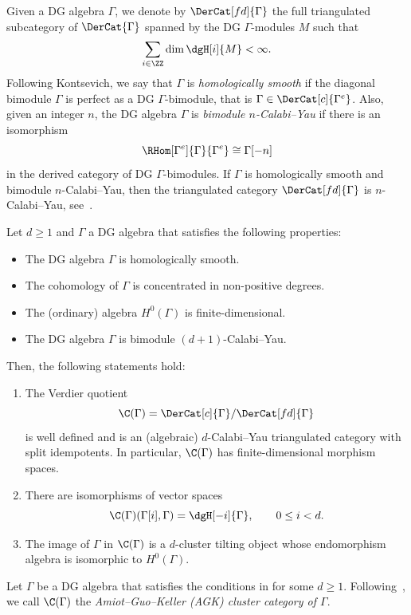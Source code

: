 \documentclass[a4paper]{amsart}
\begin{document}
Given a DG algebra $\Gamma$, we denote by $\DerCat[fd]{\Gamma}$ the full
triangulated subcategory of $\DerCat{\Gamma}$ spanned by the DG $\Gamma$-modules
$M$ such that
\[
  \sum_{i\in\ZZ}\dim \dgH[i]{M}<\infty.
\]
Following Kontsevich, we say that $\Gamma$ is \emph{homologically smooth} if the
diagonal bimodule $\Gamma$ is perfect as a DG $\Gamma$-bimodule, that is
$\Gamma\in\DerCat[c]{\Gamma^e}$. Also, given an integer $n$, the DG algebra
$\Gamma$ is \emph{bimodule $n$-Calabi--Yau} if there is an isomorphism
\[
  \RHom[\Gamma^e]{\Gamma}{\Gamma^e}\cong\Gamma[-n]
\]
in the derived category of DG $\Gamma$-bimodules. If $\Gamma$ is homologically
smooth and bimodule $n$-Calabi--Yau, then the triangulated category
$\DerCat[fd]{\Gamma}$ is $n$-Calabi--Yau, see~\cite[Lemma~4.1]{Kel08}.

\begin{theorem}[{\cite[Thm.~2.1]{Ami09} and~\cite[Thm.~2.2]{Guo11}, see also
  \cite[Thm.~5.8]{IY18} for the case $d=1$}]
  \label{thm:Amiot-Guo}
  Let $d\geq1$ and $\Gamma$ a DG algebra that satisfies the following
  properties:
  \begin{itemize}
  \item The DG algebra $\Gamma$ is homologically smooth.
  \item The cohomology of $\Gamma$ is concentrated in non-positive degrees.
  \item The (ordinary) algebra $H^0(\Gamma)$ is finite-dimensional.
  \item The DG algebra $\Gamma$ is bimodule $(d+1)$-Calabi--Yau.
  \end{itemize}
  Then, the following statements hold:
  \begin{enumerate}
  \item The Verdier quotient
    \[
      \C(\Gamma)=\DerCat[c]{\Gamma}/\DerCat[fd]{\Gamma}
    \]
    is well defined and is an (algebraic) $d$-Calabi--Yau triangulated category
    with split idempotents. In particular, $\C(\Gamma)$ has finite-dimensional
    morphism spaces. \item\cite[Lemma~2.7]{Lad16} There are isomorphisms of
    vector spaces
    \[
      \C(\Gamma)(\Gamma[i],\Gamma)=\dgH[-i]{\Gamma},\qquad 0\leq i<d.
    \]
  \item The image of $\Gamma$ in $\C(\Gamma)$ is a $d$-cluster tilting object
    whose endomorphism algebra is isomorphic to $H^0(\Gamma)$.
  \end{enumerate}
\end{theorem}

\begin{definition}
  Let $\Gamma$ be a DG algebra that satisfies the conditions in
   for some $d\geq1$. Following~\cite{IY18}, we call
  $\C(\Gamma)$ the \emph{Amiot--Guo--Keller (AGK) cluster category of $\Gamma$}.
\end{definition}
\end{document}
